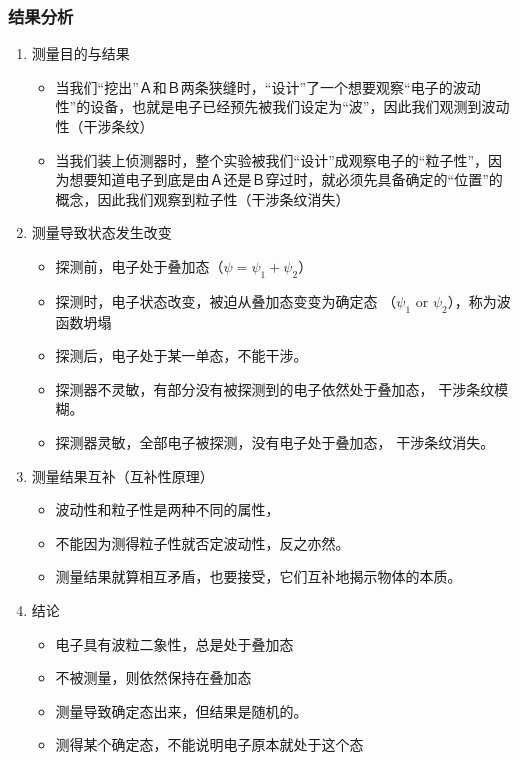 \begin{frame} [allowframebreaks=]
    \frametitle{结果分析}
    \begin{enumerate}
        \item 测量目的与结果\\
        \begin{itemize}
            \item 当我们“挖出”Ａ和Ｂ两条狭缝时，“设计”了一个想要观察“电子的波动性”的设备，也就是电子已经预先被我们设定为“波”，因此我们观测到波动性（干涉条纹）
            \item 当我们装上侦测器时，整个实验被我们“设计”成观察电子的“粒子性”，因为想要知道电子到底是由Ａ还是Ｂ穿过时，就必须先具备确定的“位置”的概念，因此我们观察到粒子性（干涉条纹消失）
        \end{itemize}
        \item 测量导致状态发生改变 \\
        \begin{itemize}
            \item 探测前，电子处于叠加态（$ \psi =\psi_1+\psi_2$）
            \item 探测时，电子状态改变，被迫从叠加态变变为确定态 （$\psi_1$ or $\psi_2$），称为波函数坍塌
            \item 探测后，电子处于某一单态，不能干涉。
            \item 探测器不灵敏，有部分没有被探测到的电子依然处于叠加态， 干涉条纹模糊。
            \item 探测器灵敏，全部电子被探测，没有电子处于叠加态， 干涉条纹消失。
        \end{itemize}
        \item 测量结果互补（互补性原理）\\
        \begin{itemize}
            \item 波动性和粒子性是两种不同的属性，
            \item 不能因为测得粒子性就否定波动性，反之亦然。
            \item 测量结果就算相互矛盾，也要接受，它们互补地揭示物体的本质。
        \end{itemize}
        \item 结论
        \begin{itemize}
            \item 电子具有波粒二象性，总是处于叠加态
            \item 不被测量，则依然保持在叠加态
            \item 测量导致确定态出来，但结果是随机的。
            \item 测得某个确定态，不能说明电子原本就处于这个态
        \end{itemize}
    \end{enumerate}
\end{frame}

